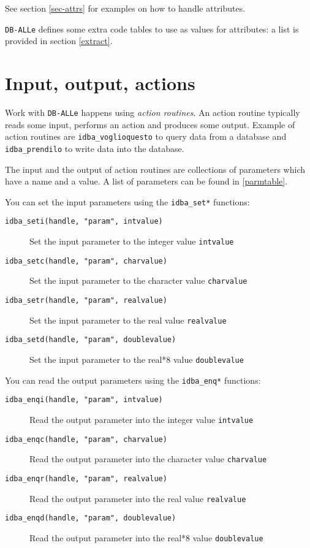 \documentclass[final,12pt,a4paper,twoside]{book}
\newcommand{\dballe}{{\tt DB-ALLe}}
\begin{document}
See section \ref{sec-attrs} for examples on how to handle attributes.

\dballe{} defines some extra code tables to use as values for attributes: a
list is provided in section \ref{extract}.

\section {Input, output, actions}
\label{basics-inout}

Work with \dballe{} happens using \emph{action routines}.  An action routine
typically reads some input, performs an action and produces some output.
Example of action routines are {\tt idba\_voglioquesto} to query data from a
database and {\tt idba\_prendilo} to write data into the database.

The input and the output of action routines are collections of parameters which
have a name and a value.  A list of parameters can be found in
\ref{parmtable}.

You can set the input parameters using the {\tt idba\_set*} functions:
\label{fun-idba_set}

\begin{description}
\item[{\tt idba\_seti(handle, "param", intvalue)}]
  Set the input parameter to the integer value {\tt intvalue}

\item[{\tt idba\_setc(handle, "param", charvalue)}]
  Set the input parameter to the character value {\tt charvalue}

\item[{\tt idba\_setr(handle, "param", realvalue)}]
  Set the input parameter to the real value {\tt realvalue}

\item[{\tt idba\_setd(handle, "param", doublevalue)}]
  Set the input parameter to the real*8 value {\tt doublevalue}
\end{description}

You can read the output parameters using the {\tt idba\_enq*} functions:
\label{fun-idba_enq}

\begin{description}
\item[{\tt idba\_enqi(handle, "param", intvalue)}]
  Read the output parameter into the integer value {\tt intvalue}

\item[{\tt idba\_enqc(handle, "param", charvalue)}]
  Read the output parameter into the character value {\tt charvalue}

\item[{\tt idba\_enqr(handle, "param", realvalue)}]
  Read the output parameter into the real value {\tt realvalue}

\item[{\tt idba\_enqd(handle, "param", doublevalue)}]
  Read the output parameter into the real*8 value {\tt doublevalue}
\end{description}
\end{document}
